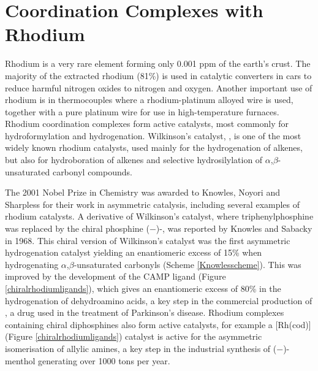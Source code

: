 
\chapter{Coordination Complexes with Rhodium}
\label{ch:rhodium}

Rhodium is a very rare element forming only 0.001 ppm of the earth's crust.\cite{Enghag2004Rhabundance}  The majority of the extracted rhodium (81\%) is used in catalytic converters in cars to reduce harmful nitrogen oxides to nitrogen and oxygen.\cite{Heck2001}  Another important use of rhodium is in thermocouples where a rhodium-platinum alloyed wire is used, together with a pure platinum wire for use in high-temperature furnaces.\cite{Enghag2004Rh}  Rhodium coordination complexes form active catalysts, most commonly for hydroformylation and hydrogenation.\cite{Leeuwenbook2000, Cui2005, Pospech2013}  Wilkinson's catalyst, , is one of the most widely known rhodium catalysts, used mainly for the hydrogenation of alkenes, but also for hydroboration of alkenes and selective hydrosilylation of $\alpha$,$\beta$-unsaturated carbonyl compounds.\cite{Osborn1966, Evans1988, Ojima1982}

The 2001 Nobel Prize in Chemistry was awarded to Knowles,\cite{Knowles2002} Noyori\cite{Noyori2002} and Sharpless\cite{Sharpless2002} for their work in asymmetric catalysis, including several examples of rhodium catalysts.  A derivative of Wilkinson's catalyst, where triphenylphosphine was replaced by the chiral phosphine ($-$)-, was reported by Knowles and Sabacky in 1968\cite{Knowles1968}.  This chiral version of Wilkinson's catalyst was the first asymmetric hydrogenation catalyst yielding an enantiomeric excess of 15\% when hydrogenating $\alpha$,$\beta$-unsaturated carbonyls (Scheme \ref{Knowlesscheme}).  This was improved by the development of the CAMP ligand (Figure \ref{chiralrhodiumligands}), which gives an enantiomeric excess of 80\% in the hydrogenation of dehydroamino acids, a key step in the commercial production of , a drug used in the treatment of Parkinson's disease.\cite{Noyori2007}  Rhodium complexes containing chiral diphosphines also form active catalysts, for example a [Rh(\acrshort{cod})] (Figure \ref{chiralrhodiumligands}) catalyst is active for the asymmetric isomerisation of allylic amines, a key step in the industrial synthesis of ($-$)-menthol generating over 1000 tons per year.\cite{Noyori2002}

